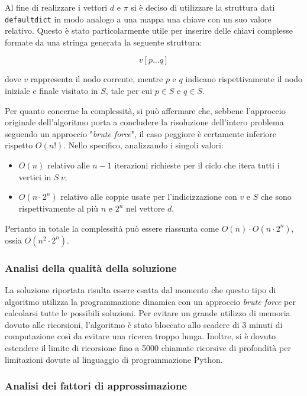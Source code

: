 Al fine di realizzare i vettori \(d\) e \(\pi\) si è deciso di utilizzare la struttura dati \texttt{defaultdict} in modo analogo a una mappa una chiave con un suo valore relativo. Questo è stato particolarmente utile per inserire delle chiavi complesse formate da una stringa generata la seguente struttura: 

\[ v [ p \dots q ]\]

dove \(v\) rappresenta il nodo corrente, mentre \(p\) e \(q\) indicano rispettivamente il nodo iniziale e finale visitato in \(S\), tale per cui \(p \in S\) e \(q \in S\).

Per quanto concerne la complessità, si può affermare che, sebbene l'approccio originale dell'algoritmo porta a concludere la risoluzione dell'intero problema seguendo un approccio "\textit{brute force}", il caso peggiore è certamente inferiore rispetto \(O(n!)\). 
Nello specifico, analizzando i singoli valori:

\begin{itemize}
    \item \(O(n)\) relativo alle \(n-1\) iterazioni richieste per il ciclo che itera tutti i vertici in \(S \ {v}\);
    \item \(O(n\cdot2^n)\) relativo alle coppie usate per l'indicizzazione con \(v\) e \(S\) che sono rispettivamente al più \(n\) e \(2^n\) nel vettore \(d\).
\end{itemize}
Pertanto in totale la complessità può essere riassunta come \(O(n) \cdot O(n\cdot2^n)\), ossia \(O(n^2\cdot2^n)\).

\subsubsection{Analisi della qualità della soluzione}

La soluzione riportata risulta essere esatta dal momento che questo tipo di algoritmo utilizza la programmazione dinamica con un approccio \textit{brute force} per calcolarsi tutte le possibili soluzioni. Per evitare un grande utilizzo di memoria dovuto alle ricorsioni, l'algoritmo è stato bloccato allo scadere di 3 minuti di computazione così da evitare una ricerca troppo lunga.
Inoltre, si è dovuto estendere il limite di ricorsione fino a 5000 chiamate ricorsive di profondità per limitazioni dovute al linguaggio di programmazione Python.

\subsubsection{Analisi dei fattori di approssimazione}

